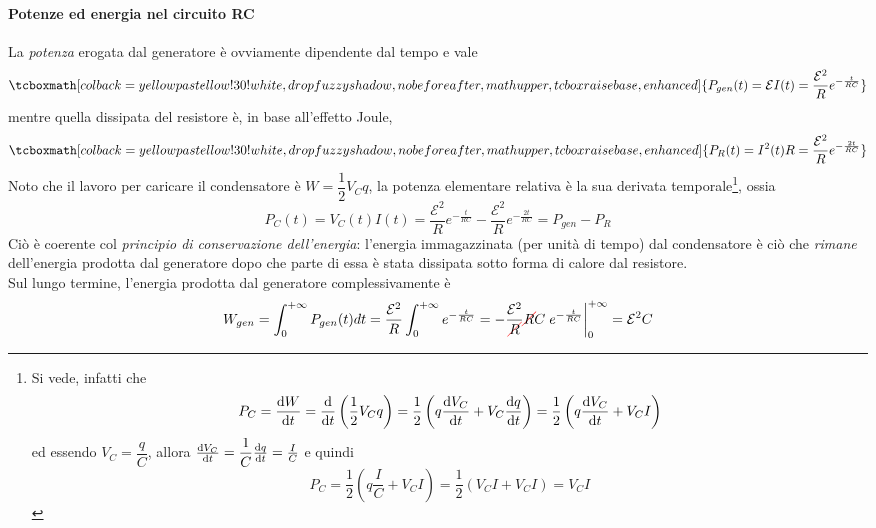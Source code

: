 \paragraph{Potenze ed energia nel circuito RC}
La \textit{potenza} erogata dal generatore è ovviamente dipendente dal tempo e vale
\begin{equation}
	\tcboxmath[colback=yellowpastellow!30!white,drop fuzzy shadow, nobeforeafter, math upper, tcbox raise base, enhanced]{P_{gen}(t)=\mathcal{E}I(t)=\frac{\mathcal{E}^2}{R}e^{-\frac{t}{RC}}}
\end{equation}
mentre quella dissipata del resistore è, in base all'effetto Joule,
\begin{equation}
	\tcboxmath[colback=yellowpastellow!30!white,drop fuzzy shadow, nobeforeafter, math upper, tcbox raise base, enhanced]{P_{R}(t)=I^2(t)R=\frac{\mathcal{E}^2}{R}e^{-\frac{2t}{RC}}}
\end{equation}
Noto che il lavoro per caricare il condensatore è $W=\dfrac{1}{2}V_Cq$, la potenza elementare relativa è la sua derivata temporale\footnote{Si vede, infatti che
\begin{equation*}
	P_{C}=\dv{W}{t}=\dv{t}\left(\frac{1}{2}V_Cq\right)=\frac{1}{2}\left(q\dv{V_C}{t}+V_C\dv{q}{t}\right)=\frac{1}{2}\left(q\dv{V_C}{t}+V_CI\right)
\end{equation*}
ed essendo $V_C=\dfrac{q}{C}$, allora $\dv{V_C}{t}=\dfrac{1}{C}\dv{q}{t}=\frac{I}{C}$ e quindi
\begin{equation*}
	P_{C}=\frac{1}{2}\left(q\frac{I}{C}+V_CI\right)=\frac{1}{2}\left(V_CI+V_CI\right)=V_CI
\end{equation*}}, ossia 
\begin{equation}
	P_{C}(t)=V_C(t)I(t)=\frac{\mathcal{E}^2}{R}e^{-\frac{t}{RC}}-\frac{\mathcal{E}^2}{R}e^{-\frac{2t}{RC}}=P_{gen}-P_{R}
\end{equation}
Ciò è coerente col \textit{principio di conservazione dell'energia}: l'energia immagazzinata (per unità di tempo) dal condensatore è ciò che \textit{rimane} dell'energia prodotta dal generatore dopo che parte di essa è stata dissipata sotto forma di calore dal resistore.\\
Sul lungo termine, l'energia prodotta dal generatore complessivamente è
\begin{equation*}
	W_{gen}=\int_{0}^{+\infty}P_{gen}(t)dt=\frac{\mathcal{E}^2}{R}\int_{0}^{+\infty}e^{-\frac{t}{RC}}=-\frac{\mathcal{E}^2}{\Ccancel[red]{R}}\Ccancel[red]{R}C\eval{e^{-\frac{t}{RC}}}_{0}^{+\infty}=\mathcal{E}^2C
\end{equation*}
